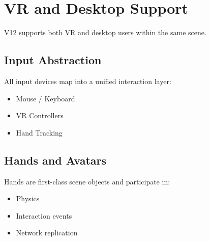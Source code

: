\section{VR and Desktop Support}

V12 supports both VR and desktop users within the same scene.

\subsection{Input Abstraction}
All input devices map into a unified interaction layer:
\begin{itemize}
	\item Mouse / Keyboard
	\item VR Controllers
	\item Hand Tracking
\end{itemize}

\subsection{Hands and Avatars}
Hands are first-class scene objects and participate in:
\begin{itemize}
	\item Physics
	\item Interaction events
	\item Network replication
\end{itemize}

